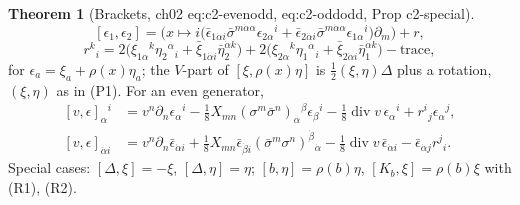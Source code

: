 \documentclass[11pt]{article}
\theoremstyle{definition}
\newtheorem{theorem}[definition]{Theorem}
\begin{document}
\begin{theorem}[Brackets, ch02 eq:c2-evenodd, eq:c2-oddodd, Prop c2-special]\label{thm:brackets}
\begin{equation}\tag{B1}
[\epsilon_1,\epsilon_2]=\Big(x\mapsto i\big(\bar\epsilon_{1\dot\alpha i}\bar\sigma^{m\dot\alpha\alpha}\epsilon_{2\alpha}{}^i+\bar\epsilon_{2\dot\alpha i}\bar\sigma^{m\dot\alpha\alpha}\epsilon_{1\alpha}{}^i\big)\partial_m\Big)+r,
\end{equation}
\begin{equation}\tag{B2}
r^k{}_i=2\big(\xi_{1\alpha}{}^k\eta_2{}^\alpha{}_i+\bar\xi_{1\dot\alpha i}\bar\eta_2^{\dot\alpha k}\big)+2\big(\xi_{2\alpha}{}^k\eta_1{}^\alpha{}_i+\bar\xi_{2\dot\alpha i}\bar\eta_1^{\dot\alpha k}\big)-\mathrm{trace},
\end{equation}
for $\epsilon_a=\xi_a+\rho(x)\eta_a$; the $V$-part of $[\xi,\rho(x)\eta]$ is $\tfrac12(\xi,\eta)\Delta$ plus a rotation, $(\xi,\eta)$ as in (P1). For an even generator,
\begin{equation}\tag{B3}
\begin{aligned}
{}[v,\epsilon]_\alpha{}^i&=v^n\partial_n\epsilon_\alpha{}^i-\tfrac18X_{mn}(\sigma^m\bar\sigma^n)_\alpha{}^\beta\epsilon_\beta{}^i-\tfrac18\operatorname{div}v\,\epsilon_\alpha{}^i+r^i{}_j\epsilon_\alpha{}^j,\\
[v,\epsilon]_{\dot\alpha i}&=v^n\partial_n\bar\epsilon_{\dot\alpha i}+\tfrac18X_{mn}\bar\epsilon_{\dot\beta i}(\bar\sigma^m\sigma^n)^{\dot\beta}{}_{\dot\alpha}-\tfrac18\operatorname{div}v\,\bar\epsilon_{\dot\alpha i}-\bar\epsilon_{\dot\alpha j}r^j{}_i .
\end{aligned}
\end{equation}
Special cases: $[\Delta,\xi]=-\xi$, $[\Delta,\eta]=\eta$; $[b,\eta]=\rho(b)\eta$, $[K_b,\xi]=\rho(b)\xi$ with (R1), (R2).
\end{theorem}
\end{document}
